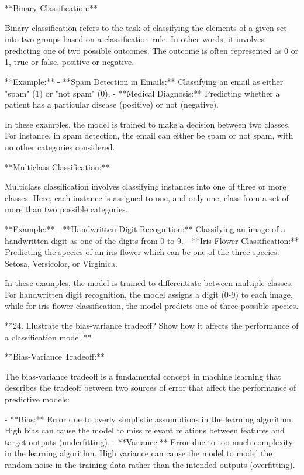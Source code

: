 **Binary Classification:**

Binary classification refers to the task of classifying the elements of a given set into two groups based on a classification rule. In other words, it involves predicting one of two possible outcomes. The outcome is often represented as 0 or 1, true or false, positive or negative.

**Example:**
- **Spam Detection in Emails:** Classifying an email as either "spam" (1) or "not spam" (0).
- **Medical Diagnosis:** Predicting whether a patient has a particular disease (positive) or not (negative).

In these examples, the model is trained to make a decision between two classes. For instance, in spam detection, the email can either be spam or not spam, with no other categories considered.

**Multiclass Classification:**

Multiclass classification involves classifying instances into one of three or more classes. Here, each instance is assigned to one, and only one, class from a set of more than two possible categories.

**Example:**
- **Handwritten Digit Recognition:** Classifying an image of a handwritten digit as one of the digits from 0 to 9.
- **Iris Flower Classification:** Predicting the species of an iris flower which can be one of the three species: Setosa, Versicolor, or Virginica.

In these examples, the model is trained to differentiate between multiple classes. For handwritten digit recognition, the model assigns a digit (0-9) to each image, while for iris flower classification, the model predicts one of three possible species.

**24. Illustrate the bias-variance tradeoff? Show how it affects the performance of a classification model.**

**Bias-Variance Tradeoff:**

The bias-variance tradeoff is a fundamental concept in machine learning that describes the tradeoff between two sources of error that affect the performance of predictive models:

- **Bias:** Error due to overly simplistic assumptions in the learning algorithm. High bias can cause the model to miss relevant relations between features and target outputs (underfitting).
- **Variance:** Error due to too much complexity in the learning algorithm. High variance can cause the model to model the random noise in the training data rather than the intended outputs (overfitting).

